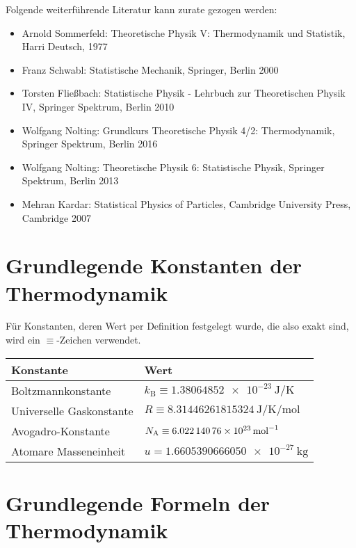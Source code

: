 Folgende weiterführende Literatur kann zurate gezogen werden:
\begin{itemize}
	\item Arnold Sommerfeld: Theoretische Physik V: Thermodynamik und Statistik, Harri Deutsch, 1977
	\item Franz Schwabl: Statistische Mechanik, Springer, Berlin 2000
	\item Torsten Fließbach: Statistische Physik - Lehrbuch zur Theoretischen Physik IV, Springer Spektrum, Berlin 2010
	\item Wolfgang Nolting: Grundkurs Theoretische Physik 4/2: Thermodynamik, Springer Spektrum, Berlin 2016
	\item Wolfgang Nolting: Theoretische Physik 6: Statistische Physik, Springer Spektrum, Berlin 2013
	\item Mehran Kardar: Statistical Physics of Particles, Cambridge University Press, Cambridge 2007
\end{itemize}



\section*{Grundlegende Konstanten der Thermodynamik}

Für Konstanten, deren Wert per Definition festgelegt wurde, die also exakt sind, wird ein $\equiv $-Zeichen verwendet.


\begin{table}[H]
	\centering
	\begin{tabular}{|l|l|} \hline
		\textbf{Konstante}       & \textbf{Wert}                                                                            \\
		\hline

		Boltzmannkonstante       & \centering\arraybackslash{} $k_\mathrm{B} \equiv \SI{1,38064852e-23}{\joule\per\kelvin}$ \\
		Universelle Gaskonstante & \centering\arraybackslash{} $R \equiv \SI{8,31446261815324}{\joule\per\kelvin\per\mole}$ \\
		Avogadro-Konstante        & \centering\arraybackslash{} $N_\mathrm{A} \equiv \SI{6,02214076e23}{\per\mole}$          \\
		Atomare Masseneinheit    & \centering\arraybackslash{} $u= \SI{1,6605390666050e-27}{\kg}$                           \\
		\hline
	\end{tabular}
\end{table}




\section*{Grundlegende Formeln der Thermodynamik}
